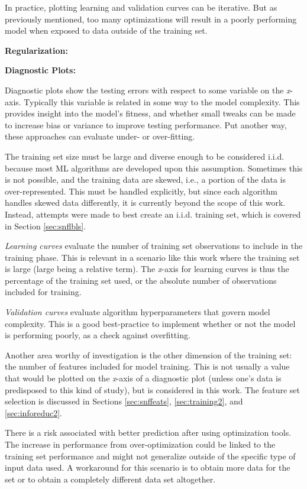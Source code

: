 In practice, plotting learning and validation curves can be iterative. But as
previously mentioned, too many optimizations will result in a poorly performing
model when exposed to data outside of the training set.

\noindent \textbf{Regularization:}


\noindent \textbf{Diagnostic Plots:} 

Diagnostic plots show the testing errors with respect to some variable on the
\textit{x}-axis.  Typically this variable is related in some way to the model
complexity. This provides insight into the model's fitness, and whether small 
tweaks can be made to increase bias or variance to improve testing performance.
Put another way, these approaches can evaluate under- or over-fitting.

The training set size must be large and diverse enough to be considered
\gls{i.i.d.} because most \gls{ML} algorithms are developed upon this
assumption. Sometimes this is not possible, and the training data are skewed,
i.e., a portion of the data is over-represented. This must be handled
explicitly, but since each algorithm handles skewed data differently, it is
currently beyond the scope of this work. Instead, attempts were made to best
create an \gls{i.i.d.} training set, which is covered in Section
\ref{sec:snflbls}.

\textit{Learning curves} evaluate the number of training set observations to
include in the training phase. This is relevant in a scenario like this work
where the training set is large (large being a relative term).  The
\textit{x}-axis for learning curves is thus the percentage of the training set
used, or the absolute number of observations included for training. 

\textit{Validation curves} evaluate algorithm hyperparameters that govern model
complexity. This is a good best-practice to implement whether or not the model 
is performing poorly, as a check against overfitting. 

Another area worthy of investigation is the other dimension of the training
set: the number of features included for model training. This is not usually a
value that would be plotted on the \textit{x}-axis of a diagnostic plot (unless
one's data is predisposed to this kind of study), but is considered in this
work. The feature set selection is discussed in Sections \ref{sec:snffeats},
\ref{sec:training2}, and \ref{sec:inforeduc2}.

There is a risk associated with better prediction after using
optimization tools.  The increase in performance from over-optimization could
be linked to the training set performance and might not generalize outside of
the specific type of input data used.  A workaround for this scenario is to
obtain more data for the set or to obtain a completely different data set
altogether. 


